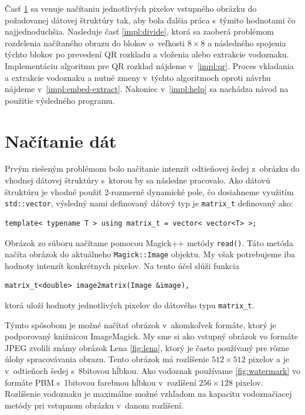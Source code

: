 Časť \ref{impl:load} sa venuje načítaniu jednotlivých pixelov vstupného obrázku do požadovanej dátovej štruktúry tak, aby bola ďalšia práca s~týmito hodnotami čo najjednoduchšia. Nasleduje časť \ref{impl:divide}, ktorá sa zaoberá problémom rozdelenia načítaného obrazu do blokov o~veľkosti $8\times8$ a následného spojenia týchto blokov po prevedení QR rozkladu a vloženia alebo extrakcie vodoznaku. Implementáciu algoritmu pre QR rozklad nájdeme v~\ref{impl:qr}. Proces vkladania a extrakcie vodoznaku a nutné zmeny v~týchto algoritmoch oproti návrhu nájdeme v~\ref{impl:embed-extract}. Nakoniec v~\ref{impl:help} sa nachádza návod na použitie výsledného programu.

\section{Načítanie dát}
\label{impl:load}
Prvým riešeným problémom bolo načítanie intenzít odtieňovej šedej z~obrázku do vhodnej dátovej štruktúry s~ktorou by sa následne pracovalo. Ako dátovú štruktúru je vhodné použiť 2-rozmerné dynamické pole, čo dosiahneme využitím {\tt std::vector}, výsledný nami definovaný dátový typ je {\tt matrix\_t} definovaný ako:

\begin{lstlisting}
template< typename T > using matrix_t = vector< vector<T> >;
\end{lstlisting}

Obrázok zo súboru načítame pomocou Magick++ metódy {\tt read()}. Táto metóda načíta obrázok do aktuálneho {\tt Magick::Image} objektu. My však potrebujeme iba hodnoty intenzít konkrétnych pixelov. Na tento účel slúži funkcia
\begin{lstlisting}
matrix_t<double> image2matrix(Image &image),
\end{lstlisting}
ktorá uloží hodnoty jednotlivých pixelov do dátového typu {\tt matrix\_t}.

Týmto spôsobom je možné načítať obrázok v~akomkoľvek formáte, ktorý je podporovaný knižnicou ImageMagick. My sme si ako vstupný obrázok vo formáte JPEG zvolili známy obrázok Lena \ref{fig:lena}, ktorý je často používaný pre rôzne úlohy spracovávania obrazu. Tento obrázok má rozlíšenie $512\times512$ pixelov a je v~odtieňoch šedej s~8bitovou hĺbkou. Ako vodoznak používame \ref{fig:watermark} vo formáte PBM s~1bitovou farebnou hĺbkou v~rozlíšení $256\times128$ pixelov. Rozlíšenie vodoznaku je maximálne možné vzhľadom na kapacitu vodoznačiacej metódy pri vstupnom obrázku v~danom rozlíšení.

